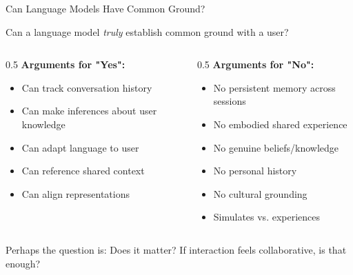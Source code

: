 \documentclass[aspectratio=169]{beamer}
\begin{document}
\begin{frame}[shrink=10]{Can Language Models Have Common Ground? 🤔}
\small
    \begin{discussion}
        Can a language model \textit{truly} establish common ground with a user?
    \end{discussion}

    \vspace{0.3cm}

    \begin{columns}[T]
        \begin{column}{0.5\textwidth}
            \textbf{Arguments for "Yes":}
            \begin{itemize}\setlength{\itemsep}{0pt}
                \item Can track conversation history
                \item Can make inferences about user knowledge
                \item Can adapt language to user
                \item Can reference shared context
                \item Can align representations
            \end{itemize}
        \end{column}

        \begin{column}{0.5\textwidth}
            \textbf{Arguments for "No":}
            \begin{itemize}\setlength{\itemsep}{0pt}
                \item No persistent memory across sessions
                \item No embodied shared experience
                \item No genuine beliefs/knowledge
                \item No personal history
                \item No cultural grounding
                \item Simulates vs. experiences
            \end{itemize}
        \end{column}
    \end{columns}

    \vspace{0.3cm}

    \begin{thinkaboutit}
        Perhaps the question is: Does it matter? If interaction feels collaborative, is that enough?
    \end{thinkaboutit}
\end{frame}
\end{document}
